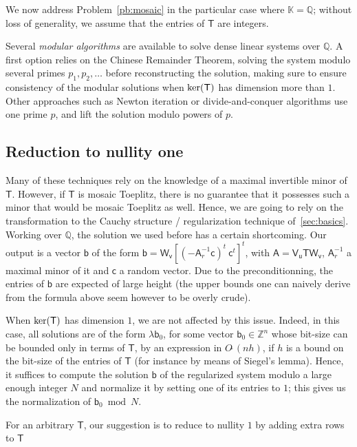 \documentclass{sig-alternate}
\newcommand{\vb}{\ensuremath{\mathsf{b}}}
\newcommand{\vc}{\ensuremath{\mathsf{c}}}
\newcommand{\vu}{\ensuremath{\mathsf{u}}}
\newcommand{\vv}{\ensuremath{\mathsf{v}}}
\newcommand{\mA}{\ensuremath{\mathsf{A}}}
\newcommand{\mT}{\ensuremath{\mathsf{T}}}
\newcommand{\mV}{\ensuremath{\mathsf{V}}}
\newcommand{\mW}{\ensuremath{\mathsf{W}}}
\newcommand{\K}{\ensuremath{\mathbb{K}}}
\newcommand{\Q}{\ensuremath{\mathbb{Q}}}
\newcommand{\Z}{\ensuremath{\mathbb{Z}}}
\newcommand{\Otilde}[1]{\ensuremath{O\tilde{~}(#1)}} %
\begin{document}
We now address Problem~\ref{pb:mosaic} in the particular case where
$\K=\Q$; without loss of generality, we assume that the entries of
$\mT$ are integers.

Several {\em modular algorithms} are available to solve dense linear
systems over $\Q$. A first option relies on the Chinese Remainder
Theorem, solving the system modulo several primes $p_1,p_2,\dots$
before reconstructing the solution, making sure to ensure consistency
of the modular solutions when ${\rm ker}(\mT)$ has dimension more than
$1$. Other approaches such as Newton iteration or divide-and-conquer
algorithms use one prime $p$, and lift the solution modulo powers of $p$.


\subsection{Reduction to nullity one}

Many of these techniques rely on the knowledge of a maximal invertible
minor of $\mT$. However, if $\mT$ is mosaic Toeplitz, there is no
guarantee that it possesses such a minor that would be mosaic Toeplitz
as well. Hence, we are going to rely on the transformation to the
Cauchy structure / regularization technique of~\ref{sec:basics}.
Working over $\Q$, the solution we used before has a certain
shortcoming. Our output is a vector $\vb$ of the form
$\vb=\mW_{\vv}[(-\mA_r^{-1}\vc)^t ~ \vc^t]^t$, with $\mA=\mV_\vu \mT
\mW_{\vv}$, $\mA_r^{-1}$ a maximal minor of it and $\vc$ a random
vector. Due to the preconditionning, the entries of $\vb$ are expected
of large height (the upper bounds one can naively derive from the
formula above seem however to be overly crude).

When ${\rm ker}(\mT)$ has dimension $1$, we are not affected by this
issue. Indeed, in this case, all solutions are of the form $\lambda
\vb_0$, for some vector $\vb_0 \in \Z^n$ whose bit-size can be bounded
only in terms of $\mT$, by an expression in $\Otilde{n h}$, if $h$ is
a bound on the bit-size of the entries of $\mT$ (for instance by means 
of Siegel's lemma). Hence, it suffices to compute the solution $\vb$ 
of the regularized system modulo a large enough integer $N$
and normalize it by setting one of its entries to $1$;
this gives us the normalization of $\vb_0 \bmod N$.

For an arbitrary $\mT$, our suggestion is to reduce to 
nullity $1$ by adding extra rows to $\mT$
\end{document}
